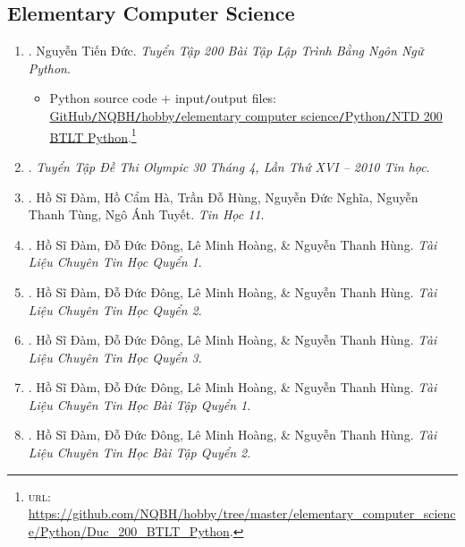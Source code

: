 \documentclass{article}
\begin{document}
\subsection{Elementary Computer Science}

\begin{enumerate}
	\item \cite{Duc_200_BT_Python}. Nguyễn Tiến Đức. \textit{Tuyển Tập 200 Bài Tập Lập Trình Bằng Ngôn Ngữ Python}.\hfill{\sf[reading]}
	\begin{itemize}
		\item Python source code $+$ input{\tt/}output files:\\\href{https://github.com/NQBH/hobby/tree/master/elementary_computer_science/Python/Duc_200_BTLT_Python}{GitHub{\tt/}NQBH{\tt/}hobby{\tt/}elementary computer science{\tt/}Python{\tt/}NTD 200 BTLT Python}.\footnote{\textsc{url}: \url{https://github.com/NQBH/hobby/tree/master/elementary_computer_science/Python/Duc_200_BTLT_Python}.}
	\end{itemize}
	\item \cite{Olympic30-4_2010_Tin_Hoc}. \textit{Tuyển Tập Đề Thi Olympic 30 Tháng 4, Lần Thứ XVI -- 2010 Tin học}.\hfill{\sf[reading]}
	\item \cite{SGK_Tin_Hoc_11}. Hồ Sĩ Đàm, Hồ Cẩm Hà, Trần Đỗ Hùng, Nguyễn Đức Nghĩa, Nguyễn Thanh Tùng, Ngô Ánh Tuyết. \textit{Tin Học 11}.\\\mbox{}\hfill{\sf[finished]}
	\item \cite{TL_chuyen_Tin_quyen_1}. Hồ Sĩ Đàm, Đỗ Đức Đông, Lê Minh Hoàng, \& Nguyễn Thanh Hùng. \textit{Tài Liệu Chuyên Tin Học Quyển 1}.\\\mbox{}\hfill{\sf[reading]}
	\item \cite{TL_chuyen_Tin_quyen_2}. Hồ Sĩ Đàm, Đỗ Đức Đông, Lê Minh Hoàng, \& Nguyễn Thanh Hùng. \textit{Tài Liệu Chuyên Tin Học Quyển 2}.\\\mbox{}\hfill{\sf[reading]}
	\item \cite{TL_chuyen_Tin_quyen_3}. Hồ Sĩ Đàm, Đỗ Đức Đông, Lê Minh Hoàng, \& Nguyễn Thanh Hùng. \textit{Tài Liệu Chuyên Tin Học Quyển 3}.\\\mbox{}\hfill{\sf[reading]}
	\item \cite{TL_chuyen_Tin_BT_quyen_1}. Hồ Sĩ Đàm, Đỗ Đức Đông, Lê Minh Hoàng, \& Nguyễn Thanh Hùng. \textit{Tài Liệu Chuyên Tin Học Bài Tập Quyển 1}.\\\mbox{}\hfill{\sf[reading]}
	\item \cite{TL_chuyen_Tin_BT_quyen_2}. Hồ Sĩ Đàm, Đỗ Đức Đông, Lê Minh Hoàng, \& Nguyễn Thanh Hùng. \textit{Tài Liệu Chuyên Tin Học Bài Tập Quyển 2}.\hfill{\sf[reading]}

\end{enumerate}
\end{document}
